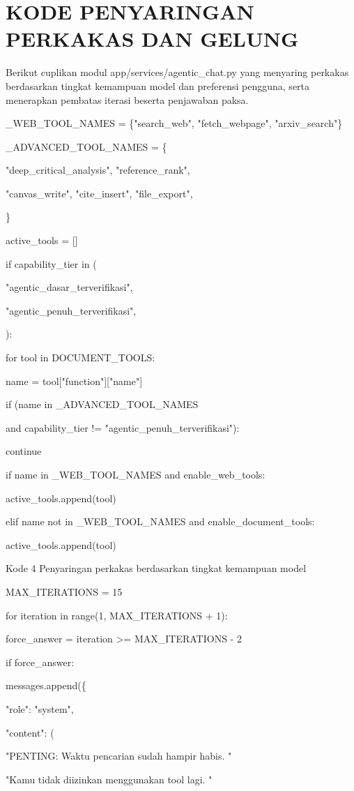 \documentclass[12pt,a4paper]{article}
\begin{document}
\section*{KODE PENYARINGAN PERKAKAS DAN GELUNG}
Berikut cuplikan modul app/services/agentic\_chat.py yang menyaring perkakas berdasarkan tingkat kemampuan model dan preferensi pengguna, serta menerapkan pembatas iterasi beserta penjawaban paksa.

\_WEB\_TOOL\_NAMES = \{"search\_web", "fetch\_webpage", "arxiv\_search"\}

\_ADVANCED\_TOOL\_NAMES = \{

"deep\_critical\_analysis", "reference\_rank",

"canvas\_write", "cite\_insert", "file\_export",

\}

active\_tools = {[}{]}

if capability\_tier in (

"agentic\_dasar\_terverifikasi",

"agentic\_penuh\_terverifikasi",

):

for tool in DOCUMENT\_TOOLS:

name = tool{[}"function"{]}{[}"name"{]}

if (name in \_ADVANCED\_TOOL\_NAMES

and capability\_tier != "agentic\_penuh\_terverifikasi"):

continue

if name in \_WEB\_TOOL\_NAMES and enable\_web\_tools:

active\_tools.append(tool)

elif name not in \_WEB\_TOOL\_NAMES and enable\_document\_tools:

active\_tools.append(tool)

Kode 4	Penyaringan perkakas berdasarkan tingkat kemampuan model

MAX\_ITERATIONS = 15

for iteration in range(1, MAX\_ITERATIONS + 1):

force\_answer = iteration \textgreater{}= MAX\_ITERATIONS - 2

if force\_answer:

messages.append(\{

"role": "system",

"content": (

"PENTING: Waktu pencarian sudah hampir habis. "

"Kamu tidak diizinkan menggunakan tool lagi. "
\end{document}
